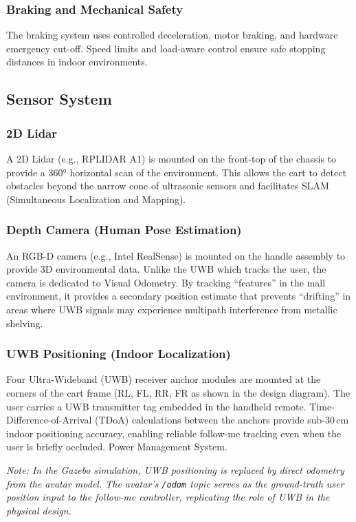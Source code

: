 \subsubsection{Braking and Mechanical Safety}
The braking system uses controlled deceleration, motor braking, and hardware emergency cut-off. Speed limits and load-aware control ensure safe stopping distances in indoor environments.

\subsection{Sensor System}
\subsubsection{2D Lidar}

A 2D Lidar (e.g., RPLIDAR A1) is mounted on the front-top of the chassis
to provide a 360° horizontal scan of the environment. This allows the
cart to detect obstacles beyond the narrow cone of ultrasonic sensors and
facilitates SLAM (Simultaneous Localization and Mapping).

\subsubsection{Depth Camera (Human Pose Estimation)}

An RGB-D camera (e.g., Intel RealSense) is mounted on the handle assembly
to provide 3D environmental data. Unlike the UWB which tracks the user,
the camera is dedicated to Visual Odometry. By tracking ``features'' in
the mall environment, it provides a secondary position estimate that
prevents ``drifting'' in areas where UWB signals may experience multipath
interference from metallic shelving.

\subsubsection{UWB Positioning (Indoor Localization)}

Four Ultra-Wideband (UWB) receiver anchor modules are mounted at the
corners of the cart frame (RL, FL, RR, FR as shown in the design
diagram). The user carries a UWB transmitter tag embedded in the handheld
remote. Time-Difference-of-Arrival (TDoA) calculations between the
anchors provide sub-30\,cm indoor positioning accuracy, enabling reliable
follow-me tracking even when the user is briefly occluded. Power
Management System.

\textit{Note: In the Gazebo simulation, UWB positioning is replaced 
by direct odometry from the avatar model. The avatar's 
\texttt{/odom} topic serves as the ground-truth user position input 
to the follow-me controller, replicating the role of UWB in the 
physical design.}

